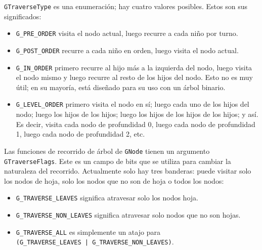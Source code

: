 \lstinline{GTraverseType} es una enumeración; hay cuatro valores posibles. Estos son sus significados:
\begin{itemize}
    \item \lstinline{G_PRE_ORDER} visita el nodo actual, luego recurre a cada niño por turno.
    
    \item \lstinline{G_POST_ORDER} recurre a cada niño en orden, luego visita el nodo actual.
    
    \item \lstinline{G_IN_ORDER} primero recurre al hijo más a la izquierda del nodo, luego visita el nodo mismo y luego recurre al resto de los hijos del nodo. Esto no es muy útil; en su mayoría, está diseñado para su uso con un árbol binario.
    
    \item \lstinline{G_LEVEL_ORDER} primero visita el nodo en sí; luego cada uno de los hijos del nodo; luego los hijos de los hijos; luego los hijos de los hijos de los hijos; y así. Es decir, visita cada nodo de profundidad 0, luego cada nodo de profundidad 1, luego cada nodo de profundidad 2, etc.
\end{itemize}

Las funciones de recorrido de árbol de \lstinline{GNode} tienen un argumento \lstinline{GTraverseFlags}. Este es un campo de bits que se utiliza para cambiar la naturaleza del recorrido. Actualmente solo hay tres banderas: puede visitar solo los nodos de hoja, solo los nodos que no son de hoja o todos los nodos:
\begin{itemize}
    \item \lstinline{G_TRAVERSE_LEAVES} significa atravesar solo los nodos hoja.
    \item \lstinline{G_TRAVERSE_NON_LEAVES} significa atravesar solo nodos que no son hojas.
    \item \lstinline{G_TRAVERSE_ALL} es simplemente un atajo para \\
    \lstinline{(G_TRAVERSE_LEAVES | G_TRAVERSE_NON_LEAVES)}.
\end{itemize}

